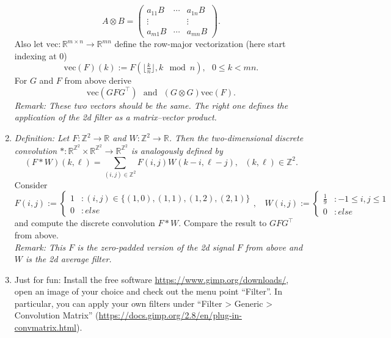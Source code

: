 \begin{enumerate}
{	 $$A \otimes B = \begin{pmatrix}
	 a_{11}B &\cdots& a_{1n} B \\
	 \vdots & &\vdots\\
	 a_{m1}B &\cdots& a_{mn} B
	 \end{pmatrix} .$$
 	 Also let $\text{vec}\colon \mathbb{R}^{m \times n} \to \mathbb{R}^{mn}$ define the row-major vectorization (here start indexing at $0$)
  	 $$\text{vec}(F)(k) := F(\lfloor\tfrac{k}{n}\rfloor, k \mod n),~~~0\leq k <mn.$$ }
   	For $G$ and $F$ from above derive 
   	$$\text{vec}(G F G^\top)~~~\text{and}~~~(G \otimes G)\text{vec}(F). $$
   	\textit{Remark: These two vectors should be the same. The right one defines the application of the 2d filter as a matrix--vector product.}
	\item \textit{\color{navy}Definition: Let $F\colon\mathbb{Z}^2\to\mathbb{R}$ and $W\colon\mathbb{Z}^2\to\mathbb{R}$. Then the two-dimensional discrete convolution $\ast\colon \mathbb{R}^{\mathbb{Z}^2}\times \mathbb{R}^{\mathbb{Z}^2}\to \mathbb{R}^{\mathbb{Z}^2}$ is analogously defined by 
		$$ (F \ast W)(k,\ell)  = \sum_{(i,j)\in \mathbb{Z}^2}F(i,j)W(k-i, \ell-j),~~~(k,\ell)\in\mathbb{Z}^2. $$}
	Consider 
	$$
	F(i,j) := \begin{cases}
	1 &: (i,j) \in \{(1,0),(1,1),(1,2), (2,1)\}\\
	0 &: else
	\end{cases},~~~~
	W(i,j) := \begin{cases}
	\tfrac{1}{9} &: -1\leq i,j \leq 1\\
	0 &: else
	\end{cases}
	$$
	and compute the discrete convolution $F \ast W$. Compare the result to $GFG^\top$ from above.\\
	\textit{Remark: This $F$ is the zero-padded version of the 2d signal $F$ from above and $W$ is the 2d average filter.}
	\item Just for fun: Install the free software \url{https://www.gimp.org/downloads/}, open an image of your choice and check out the menu point ``Filter''. In particular, you can apply your own filters under ``Filter > Generic > Convolution Matrix'' (\url{https://docs.gimp.org/2.8/en/plug-in-convmatrix.html}).
\end{enumerate}